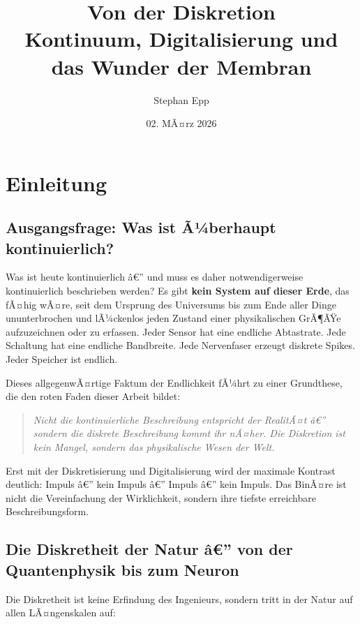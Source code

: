 ﻿\documentclass[12pt,a4paper,titlepage]{report}
\title{\textbf{Von der Diskretion} \\ 
	\large Kontinuum, Digitalisierung und das Wunder der Membran}
\author{Stephan Epp}
\date{02. MÃ¤rz 2026}
\begin{document}
\maketitle

\newpage
\tableofcontents
\newpage

\chapter{Einleitung}

\section{Ausgangsfrage: Was ist Ã¼berhaupt kontinuierlich?}

Was ist heute kontinuierlich â€” und muss es daher notwendigerweise kontinuierlich
beschrieben werden?
Es gibt \textbf{kein System auf dieser Erde}, das fÃ¤hig wÃ¤re, seit dem Ursprung
des Universums bis zum Ende aller Dinge ununterbrochen und lÃ¼ckenlos jeden
Zustand einer physikalischen GrÃ¶ÃŸe aufzuzeichnen oder zu erfassen.
Jeder Sensor hat eine endliche Abtastrate.
Jede Schaltung hat eine endliche Bandbreite.
Jede Nervenfaser erzeugt diskrete Spikes.
Jeder Speicher ist endlich.

Dieses allgegenwÃ¤rtige Faktum der Endlichkeit fÃ¼hrt zu einer Grundthese,
die den roten Faden dieser Arbeit bildet:

\begin{quote}
	\itshape
	Nicht die kontinuierliche Beschreibung entspricht der RealitÃ¤t â€”
	sondern die diskrete Beschreibung kommt ihr nÃ¤her.
	Die Diskretion ist kein Mangel, sondern das physikalische Wesen der Welt.
\end{quote}

Erst mit der Diskretisierung und Digitalisierung wird der maximale Kontrast
deutlich: Impuls â€” kein Impuls â€” Impuls â€” kein Impuls.
Das BinÃ¤re ist nicht die Vereinfachung der Wirklichkeit, sondern ihre tiefste
erreichbare Beschreibungsform.

\section{Die Diskretheit der Natur â€” von der Quantenphysik bis zum Neuron}

Die Diskretheit ist keine Erfindung des Ingenieurs, sondern tritt in der Natur
auf allen LÃ¤ngenskalen auf:
\end{document}

